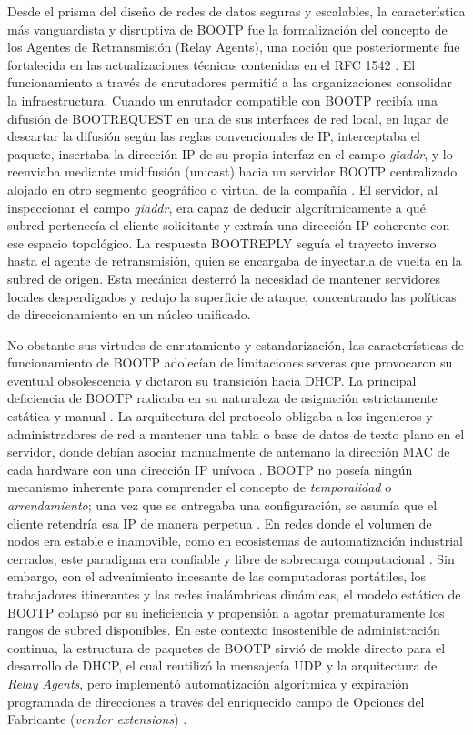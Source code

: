 \documentclass[a4paper,12pt]{article}
\begin{document}
Desde el prisma del diseño de redes de datos seguras y escalables, la característica más vanguardista y disruptiva de BOOTP fue la formalización del concepto de los Agentes de Retransmisión (Relay Agents), una noción que posteriormente fue fortalecida en las actualizaciones técnicas contenidas en el RFC 1542 \cite{rfc1542}. El funcionamiento a través de enrutadores permitió a las organizaciones consolidar la infraestructura. Cuando un enrutador compatible con BOOTP recibía una difusión de BOOTREQUEST en una de sus interfaces de red local, en lugar de descartar la difusión según las reglas convencionales de IP, interceptaba el paquete, insertaba la dirección IP de su propia interfaz en el campo \textit{giaddr}, y lo reenviaba mediante unidifusión (unicast) hacia un servidor BOOTP centralizado alojado en otro segmento geográfico o virtual de la compañía \cite{rfc1542}. El servidor, al inspeccionar el campo \textit{giaddr}, era capaz de deducir algorítmicamente a qué subred pertenecía el cliente solicitante y extraía una dirección IP coherente con ese espacio topológico. La respuesta BOOTREPLY seguía el trayecto inverso hasta el agente de retransmisión, quien se encargaba de inyectarla de vuelta en la subred de origen. Esta mecánica desterró la necesidad de mantener servidores locales desperdigados y redujo la superficie de ataque, concentrando las políticas de direccionamiento en un núcleo unificado.

No obstante sus virtudes de enrutamiento y estandarización, las características de funcionamiento de BOOTP adolecían de limitaciones severas que provocaron su eventual obsolescencia y dictaron su transición hacia DHCP. La principal deficiencia de BOOTP radicaba en su naturaleza de asignación estrictamente estática y manual \cite{lightyear_bootp_dhcp, geeksforgeeks_bootp_dhcp}. La arquitectura del protocolo obligaba a los ingenieros y administradores de red a mantener una tabla o base de datos de texto plano en el servidor, donde debían asociar manualmente de antemano la dirección MAC de cada hardware con una dirección IP unívoca \cite{ionos_bootp, lightyear_bootp_dhcp}. BOOTP no poseía ningún mecanismo inherente para comprender el concepto de \textit{temporalidad} o \textit{arrendamiento}; una vez que se entregaba una configuración, se asumía que el cliente retendría esa IP de manera perpetua \cite{ionos_bootp, geeksforgeeks_bootp_dhcp}. En redes donde el volumen de nodos era estable e inamovible, como en ecosistemas de automatización industrial cerrados, este paradigma era confiable y libre de sobrecarga computacional \cite{imd_bootp_dhcp}. Sin embargo, con el advenimiento incesante de las computadoras portátiles, los trabajadores itinerantes y las redes inalámbricas dinámicas, el modelo estático de BOOTP colapsó por su ineficiencia y propensión a agotar prematuramente los rangos de subred disponibles. En este contexto insostenible de administración continua, la estructura de paquetes de BOOTP sirvió de molde directo para el desarrollo de DHCP, el cual reutilizó la mensajería UDP y la arquitectura de \textit{Relay Agents}, pero implementó automatización algorítmica y expiración programada de direcciones a través del enriquecido campo de Opciones del Fabricante (\textit{vendor extensions}) \cite{rfc2131, lightyear_bootp_dhcp}.
\end{document}
